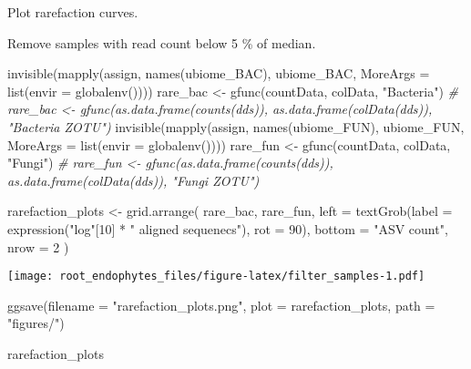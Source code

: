 \documentclass[
]{article}
\newenvironment{Shaded}{\begin{snugshade}}{\end{snugshade}}
\newcommand{\AttributeTok}[1]{\textcolor[rgb]{0.77,0.63,0.00}{#1}}
\newcommand{\CommentTok}[1]{\textcolor[rgb]{0.56,0.35,0.01}{\textit{#1}}}
\newcommand{\DecValTok}[1]{\textcolor[rgb]{0.00,0.00,0.81}{#1}}
\newcommand{\FunctionTok}[1]{\textcolor[rgb]{0.00,0.00,0.00}{#1}}
\newcommand{\NormalTok}[1]{#1}
\newcommand{\OtherTok}[1]{\textcolor[rgb]{0.56,0.35,0.01}{#1}}
\newcommand{\SpecialCharTok}[1]{\textcolor[rgb]{0.00,0.00,0.00}{#1}}
\newcommand{\StringTok}[1]{\textcolor[rgb]{0.31,0.60,0.02}{#1}}
\begin{document}
Plot rarefaction curves.

Remove samples with read count below 5 \% of median.

\begin{Shaded}
\begin{Highlighting}[]
\FunctionTok{invisible}\NormalTok{(}\FunctionTok{mapply}\NormalTok{(assign, }\FunctionTok{names}\NormalTok{(ubiome\_BAC), ubiome\_BAC, }\AttributeTok{MoreArgs =} \FunctionTok{list}\NormalTok{(}\AttributeTok{envir =} \FunctionTok{globalenv}\NormalTok{())))}
\NormalTok{rare\_bac }\OtherTok{\textless{}{-}} \FunctionTok{gfunc}\NormalTok{(countData, colData, }\StringTok{"Bacteria"}\NormalTok{)}
\CommentTok{\# rare\_bac \textless{}{-} gfunc(as.data.frame(counts(dds)), as.data.frame(colData(dds)), "Bacteria ZOTU")}
\FunctionTok{invisible}\NormalTok{(}\FunctionTok{mapply}\NormalTok{(assign, }\FunctionTok{names}\NormalTok{(ubiome\_FUN), ubiome\_FUN, }\AttributeTok{MoreArgs =} \FunctionTok{list}\NormalTok{(}\AttributeTok{envir =} \FunctionTok{globalenv}\NormalTok{())))}
\NormalTok{rare\_fun }\OtherTok{\textless{}{-}} \FunctionTok{gfunc}\NormalTok{(countData, colData, }\StringTok{"Fungi"}\NormalTok{)}
\CommentTok{\# rare\_fun \textless{}{-} gfunc(as.data.frame(counts(dds)), as.data.frame(colData(dds)), "Fungi ZOTU")}

\NormalTok{rarefaction\_plots }\OtherTok{\textless{}{-}} \FunctionTok{grid.arrange}\NormalTok{(}
\NormalTok{  rare\_bac, rare\_fun,}
  \AttributeTok{left =} \FunctionTok{textGrob}\NormalTok{(}\AttributeTok{label =} \FunctionTok{expression}\NormalTok{(}\StringTok{"log"}\NormalTok{[}\DecValTok{10}\NormalTok{] }\SpecialCharTok{*} \StringTok{" aligned sequenecs"}\NormalTok{), }\AttributeTok{rot =} \DecValTok{90}\NormalTok{),}
  \AttributeTok{bottom =} \StringTok{"ASV count"}\NormalTok{, }\AttributeTok{nrow =} \DecValTok{2}
\NormalTok{)}
\end{Highlighting}
\end{Shaded}

\texttt{[image: root\_endophytes\_files/figure-latex/filter\_samples-1.pdf]}

\begin{Shaded}
\begin{Highlighting}[]
\FunctionTok{ggsave}\NormalTok{(}\AttributeTok{filename =} \StringTok{"rarefaction\_plots.png"}\NormalTok{, }\AttributeTok{plot =}\NormalTok{ rarefaction\_plots, }\AttributeTok{path =} \StringTok{"figures/"}\NormalTok{)}

\NormalTok{rarefaction\_plots}
\end{Highlighting}
\end{Shaded}
\end{document}
